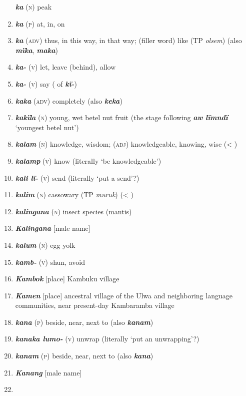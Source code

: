 \begin{enumerate}[noitemsep, label={}, align=left, widest=190, labelsep=1ex,leftmargin=*,itemindent=-10pt]
\textbf{\textit{ka}} (\textsc{n}) peak \item 
\textbf{\textit{ka}} (\textsc{p}) at, in, on \item 
\textbf{\textit{ka}} (\textsc{adv}) thus, in this way, in that way; (filler word) like (TP \textit{olsem}) (also \textbf{\textit{mïka}}, \textbf{\textit{maka}}) \item 
\textbf{\textit{ka-}} (\textsc{v}) let, leave (behind), allow \item 
\textbf{\textit{ka-}} (\textsc{v}) say (  of \textbf{\textit{kï-}}) \item 
\textbf{\textit{kaka}} (\textsc{adv}) completely (also \textbf{\textit{keka}}) \item 
\textbf{\textit{kakïla}} (\textsc{n}) young, wet betel nut fruit (the stage following \textbf{\textit{aw lïmndï}} ‘youngest betel nut’) \item 
\textbf{\textit{kalam}} (\textsc{n}) knowledge, wisdom; (\textsc{adj}) knowledgeable, knowing, wise (< ) \item 
\textbf{\textit{kalamp}} (\textsc{v}) know (literally ‘be knowledgeable’) \item 
\textbf{\textit{kali lï-}} (\textsc{v}) send (literally ‘put a send’?) \item 
\textbf{\textit{kalim}} (\textsc{n}) cassowary (TP \textit{muruk}) (< ) \item 
\textbf{\textit{kalingana}} (\textsc{n}) insect species (mantis) \item 
\textbf{\textit{Kalingana}} [male name] \item 
\textbf{\textit{kalum}} (\textsc{n}) egg yolk \item 
\textbf{\textit{kamb-}} (\textsc{v}) shun, avoid \item 
\textbf{\textit{Kambok}} [place] Kambuku village \item 
\textbf{\textit{Kamen}} [place] ancestral village of the Ulwa and neighboring language \linebreak communities, near present-day Kambaramba village \item 
\textbf{\textit{kana}} (\textsc{p}) beside, near, next to (also \textbf{\textit{kanam}}) \item 
\textbf{\textit{kanaka lumo-}} (\textsc{v}) unwrap (literally ‘put an unwrapping’?) \item 
\textbf{\textit{kanam}} (\textsc{p}) beside, near, next to (also \textbf{\textit{kana}}) \item 
\textbf{\textit{Kanang}} [male name] \item 

\end{enumerate}
